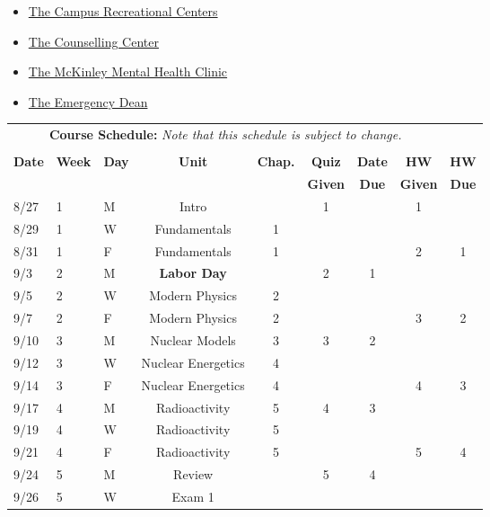\documentclass[11pt, a4paper]{article}
\begin{document}
\begin{itemize}
\item \href{https://campusrec.illinois.edu/}{The Campus Recreational Centers}
\item \href{http://counselingcenter.illinois.edu/}{The Counselling Center}
\item \href{http://www.mckinley.illinois.edu/clinics/mental\_health.htm}{The McKinley Mental Health Clinic}
\item \href{http://odos.illinois.edu/emergency/}{The Emergency Dean}
\end{itemize}

\pagebreak
\FloatBarrier
\renewcommand{\arraystretch}{1}
\begin{table}[h]
\begin{center}
\begin{tabular}{lllcccccc}
\multicolumn{8}{c}{\textbf{Course Schedule:}\textit{ Note that this schedule is 
subject to change.}}\\
&&&&&&&&\\
\textbf{Date} & \textbf{Week} & \textbf{Day} & \textbf{Unit} & \textbf{Chap.} & \textbf{Quiz}& \textbf{Date} & \textbf{HW} & \textbf{HW}\\
              &  &  &  &  & \textbf{Given} & \textbf{Due} & \textbf{Given} & \textbf{Due}\\ \hline
\hline
8/27 & 1 & M  & Intro &  & 1 &  & 1 & \\
8/29 & 1 & W & Fundamentals & 1 &  &  &  &  \\
8/31 & 1 & F & Fundamentals & 1 &  &  & 2 & 1 \\
9/3 & 2 & M & \textbf{Labor Day}  &  & 2 & 1 &  &  \\
9/5 & 2 & W & Modern Physics  & 2 &  &  &  &  \\
9/7 & 2 & F & Modern Physics & 2 &  &  & 3 & 2 \\
9/10 & 3 & M & Nuclear Models  & 3 & 3 & 2 &  &  \\
9/12 & 3 & W & Nuclear Energetics  & 4 &  &  &  &  \\
9/14 & 3 & F & Nuclear Energetics  & 4 &  &  & 4 & 3 \\
9/17 & 4 & M & Radioactivity  & 5 & 4 & 3 &  &  \\
9/19 & 4 & W & Radioactivity  & 5 &  &  &  &  \\
9/21 & 4 & F & Radioactivity  & 5 &  &  & 5 & 4 \\
9/24 & 5 & M & Review  &  & 5 & 4 &  &  \\
9/26 & 5 & W & Exam 1  &  &  &  &  &  \\

\end{tabular}
\end{center}
\end{table}
\end{document}
